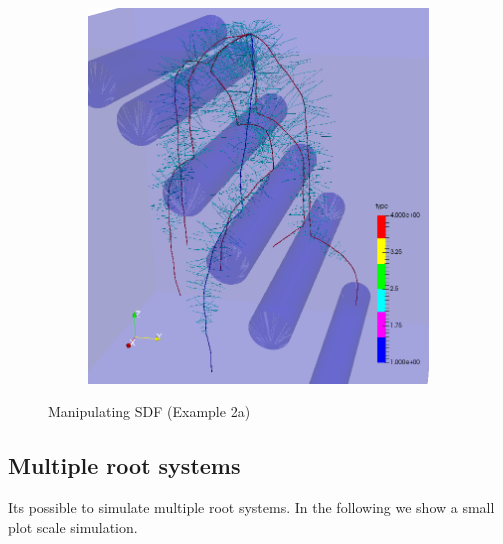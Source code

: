 \documentclass[a4paper]{article}
\begin{document}
\begin{figure}
\begin{subfigure}[c]{0.3\textwidth}
 \label{fig:split}
\end{subfigure}
\begin{subfigure}[c]{0.3\textwidth}
\includegraphics[width=0.99\textwidth]{example_2a3.png}
 \label{fig:rhizotubes}
\end{subfigure}
\caption{Manipulating SDF (Example 2a)}
\end{figure}



\subsection{Multiple root systems}

Its possible to simulate multiple root systems. In the following we show a small plot scale simulation.


\end{document}
